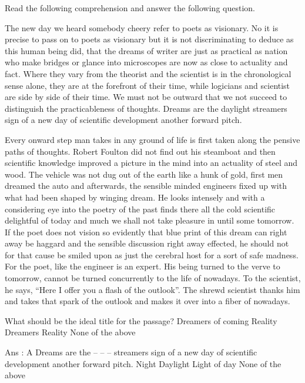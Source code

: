 


Read the following comprehension and answer the following question.

    The new day we heard somebody cheery refer to poets as visionary. No it is precise to pass on to poets as visionary but it is not discriminating to deduce as this human being did, that the dreams of writer are just as practical as nation who make bridges or glance into microscopes are now as close to actuality and fact. Where they vary from the theorist and the scientist is in the chronological sense alone, they are at the forefront of their time, while logicians and scientist are side by side of their time. We must not be outward that we not succeed to distinguish the practicableness of thoughts. Dreams are the daylight streamers sign of a new day of scientific development another forward pitch.

    Every onward step man takes in any ground of life is first taken along the pensive paths of thoughts. Robert Foulton did not find out his steamboat and then scientific knowledge improved a picture in the mind into an actuality of steel and wood. The vehicle was not dug out of the earth like a hunk of gold, first men dreamed the auto and afterwards, the sensible minded engineers fixed up with what had been shaped by winging dream. He looks intensely and with a considering eye into the poetry of the past finds there all the cold scientific delightful of today and much we shall not take pleasure in until some tomorrow. If the poet does not vision so evidently that blue print of this dream can right away be haggard and the sensible discussion right away effected, he should not for that cause be smiled upon as just the cerebral host for a sort of safe madness. For the poet, like the engineer is an expert. His being turned to the verve to tomorrow, cannot be turned concurrently to the life of nowadays. To the scientist, he says, “Here I offer you a flash of the outlook”. The shrewd scientist thanks him and takes that spark of the outlook and makes it over into a fiber of nowadays.

        What should be the ideal title for the passage?
            Dreamers of coming Reality
            Dreamers
            Reality
            None of the above 

        Ans : A
        Dreams are the -- -- -- streamers sign of a new day of scientific development another forward pitch.
            Night
            Daylight
            Light of day
            None of the above 

